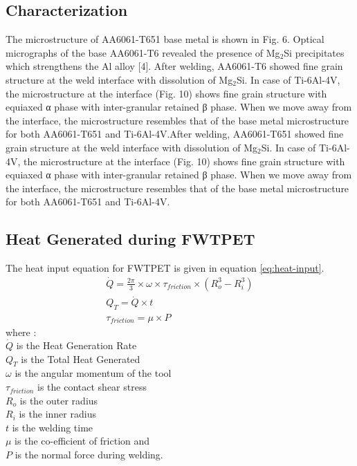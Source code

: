 \documentclass[3p]{elsarticle}
\begin{document}
\subsection{Characterization}
\label{subsec:results-characterization}
The microstructure of AA6061-T651 base metal is shown in Fig. 6. Optical micrographs of the base AA6061-T6 revealed the presence of Mg$_{2}$Si precipitates which strengthens the Al
alloy [4]. After welding, AA6061-T6 showed fine grain structure at the weld interface with dissolution of Mg$_{2}$Si. In case of Ti-6Al-4V, the microstructure at the interface (Fig. 10) shows fine grain structure with equiaxed α phase with inter-granular retained β phase. When we move away from the interface, the
microstructure resembles that of the base metal microstructure for both AA6061-T651 and Ti-6Al-4V.After welding, AA6061-T651 showed fine grain structure at the weld interface with dissolution of Mg$_{2}$Si. In case of Ti-6Al-4V, the microstructure at the interface (Fig. 10) shows fine grain structure with equiaxed α phase with inter-granular retained β phase. When we move away from the interface, the microstructure resembles that of the base metal microstructure for both AA6061-T651 and Ti-6Al-4V.

\subsection{Heat Generated during FWTPET}
\label{subsec:Heat Generated during FWTPET}
The heat input equation for FWTPET is given in equation \ref{eq:heat-input}.
\begin{gather} 
\dot{Q} =  \frac{2\pi}{3} \times  \omega \times \tau_{friction} \times (R^{3}_{o} - R^{3}_{i}) \\
Q_{T} = \dot{Q} \times t \label{eq:total-heat-input} \\
\tau_{friction} = \mu \times P \label{eq:Contact-shear-stress}
\end{gather}
where : \\
$\dot{Q}$ is the Heat Generation Rate \\
$Q_{T}$ is the Total Heat Generated \\
$\omega$ is the angular momentum of the tool \\
$\tau_{friction}$ is the contact shear stress \\
$R_{o}$ is the outer radius \\
$R_{i}$ is the inner radius \\
$t$ is the welding time \\
$\mu$ is the co-efficient of friction and\\
$P$ is the normal force during welding.
\end{document}
